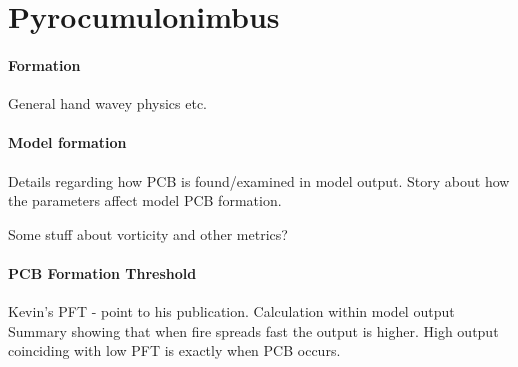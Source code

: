 \section{Pyrocumulonimbus}
  \label{pcb}
  
  \paragraph{Formation}
    General hand wavey physics etc.
     
  \paragraph{Model formation}
    Details regarding how PCB is found/examined in model output.
    Story about how the parameters affect model PCB formation.
  
    Some stuff about vorticity and other metrics?
    
  \paragraph{PCB Formation Threshold}
    Kevin's PFT - point to his publication.
    Calculation within model output
    Summary showing that when fire spreads fast the output is higher.
    High output coinciding with low PFT is exactly when PCB occurs.
  